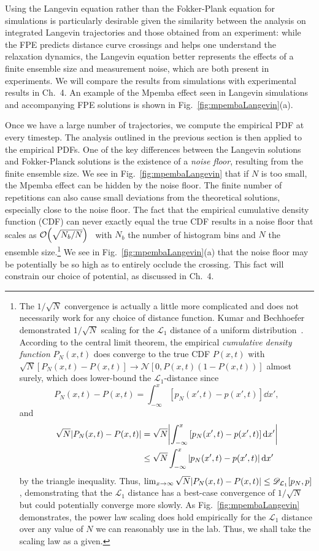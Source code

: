 \documentclass[hyperref={colorlinks=true, urlcolor=blue, citecolor=blue, final, bound}]{sfuthesis}
\begin{document}
Using the Langevin equation rather than the Fokker-Plank equation for simulations is particularly desirable given the similarity between the analysis on integrated Langevin trajectories and those obtained from an experiment: while the FPE predicts distance curve crossings and helps one understand the relaxation dynamics, the Langevin equation better represents the effects of a finite ensemble size and measurement noise, which are both present in experiments. We will compare the results from simulations with experimental results in Ch.~4. An example of the Mpemba effect seen in Langevin simulations and accompanying FPE solutions is shown in Fig.~\ref{fig:mpembaLangevin}(a).

Once we have a large number of trajectories, we compute the empirical PDF at every timestep. The analysis outlined in the previous section is then applied to the empirical PDFs. One of the key differences between the Langevin solutions and Fokker-Planck solutions is the existence of a \textit{noise floor}, resulting from the finite ensemble size. We see in Fig.~\ref{fig:mpembaLangevin} that if $N$ is too small, the Mpemba effect can be hidden by the noise floor. The finite number of repetitions can also cause small deviations from the theoretical solutions, especially close to the noise floor. The fact that the empirical cumulative density function (CDF) can never exactly equal the true CDF results in a noise floor that scales as $\order{\sqrt{N_b/N}}$~\cite{Kumar2020} with $N_b$ the number of histogram bins and $N$ the ensemble size.\footnote{The $1/\sqrt{N}$ convergence is actually a little more complicated and does not necessarily work for any choice of distance function. Kumar and Bechhoefer demonstrated $1/\sqrt N$ scaling for the $\mathcal L_1$ distance of a uniform distribution~\cite{Kumar2020}. According to the central limit theorem, the empirical \textit{cumulative density function} $P_N(x,t)$ does converge to the true CDF $P(x,t)$ with $\sqrt N[P_N(x,t)-P(x,t)] \rightarrow \mathcal N[0,P(x,t)(1-P(x,t))]$ almost surely, which does lower-bound the $\mathcal L_1$-distance since 
\[P_N(x,t)-P(x,t) = \int_{-\infty}^x \left[ p_N(x',t) - p(x',t) \right]\dd{x'},\]
and 
\begin{align*}
    \sqrt N\abs{P_N(x,t)-P(x,t)} &= \sqrt N\abs{\int_{-\infty}^x \left[ p_N(x',t) - p(x',t) \right]\dd{x'}}\\
    &\leq \sqrt N\int_{-\infty}^x \abs{p_N(x',t) - p(x',t)}\dd{x'}
\end{align*}
by the triangle inequality. Thus, $\lim_{x\rightarrow\infty} \sqrt N\abs{P_N(x,t)-P(x,t)}\leq \mathscr D_{\mathcal L_1}[p_N,p]$, demonstrating that the $\mathcal L_1$ distance has a best-case convergence of $1/\sqrt N$ but could potentially converge more slowly. As Fig.~\ref{fig:mpembaLangevin} demonstrates, the power law scaling does hold empirically for the $\mathcal L_1$ distance over any value of $N$ we can reasonably use in the lab. Thus, we shall take the scaling law as a given.} We see in Fig.~\ref{fig:mpembaLangevin}(a) that the noise floor may be potentially be so high as to entirely occlude the crossing. This fact will constrain our choice of potential, as discussed in Ch.~4.
\end{document}
